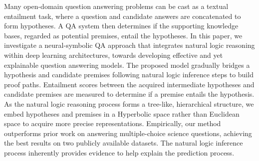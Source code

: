 Many open-domain question answering problems can be cast as a textual entailment task, where a question and candidate answers are concatenated to form hypotheses. A QA system then determines if the supporting knowledge bases, regarded as potential premises, entail the hypotheses. In this paper, we investigate a neural-symbolic QA approach that integrates natural logic reasoning within deep learning architectures, towards developing effective and yet explainable question answering models. The proposed model gradually bridges a hypothesis and candidate premises following natural logic inference steps to build proof paths. Entailment scores between the acquired intermediate hypotheses and candidate premises are measured to determine if a premise entails the hypothesis. As the natural logic reasoning process forms a tree-like, hierarchical structure, we embed hypotheses and premises in a Hyperbolic space rather than Euclidean space to acquire more precise representations. Empirically, our method outperforms prior work on answering multiple-choice science questions, achieving the best results on two publicly available datasets. The natural logic inference process inherently provides evidence to help explain the prediction process.
